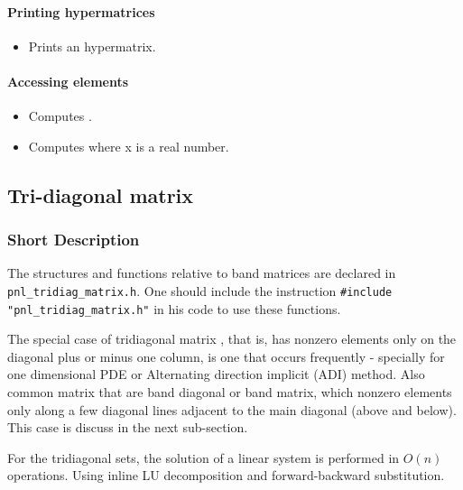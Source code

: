 \paragraph{Printing hypermatrices}

\begin{itemize}
\item {}
  \sshortdescribe Prints an hypermatrix.
\end{itemize}

\paragraph{Accessing elements}

\begin{itemize}
\item {}
  \sshortdescribe Computes .
  
\item {}
  \sshortdescribe Computes  where x is a real number.
\end{itemize}



\subsection{Tri-diagonal matrix}
\subsubsection{Short Description}

The structures and functions relative to band matrices are declared in
\verb!pnl_tridiag_matrix.h!. One should include the instruction
\verb!#include "pnl_tridiag_matrix.h"! in his code to use these functions.


The special case of tridiagonal matrix , that is, has nonzero elements only on
the diagonal plus or minus one column, is one that occurs frequently - specially
for one dimensional PDE or Alternating direction implicit (ADI) method. Also
common matrix that are band diagonal or band matrix, which nonzero elements
only along a few diagonal lines adjacent to the main diagonal (above and
below). This case is discuss in the next sub-section.

For the tridiagonal sets, the solution of a linear system is performed in $O(n)$
operations. Using inline LU decomposition and forward-backward substitution.

